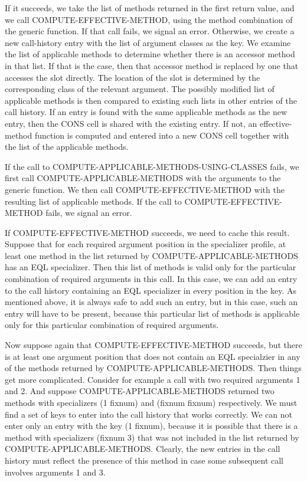 If it succeeds, we take the list of methods returned in the
first return value, and we call COMPUTE-EFFECTIVE-METHOD, using the
method combination of the generic function.  If that call fails, we
signal an error.  Otherwise, we create a new call-history entry with
the list of argument classes as the key.  We examine the list of
applicable methods to determine whether there is an accessor method in
that list.  If that is the case, then that accessor method is replaced
by one that accesses the slot directly.  The location of the slot is
determined by the corresponding class of the relevant argument.  The
possibly modified list of applicable methods is then compared to
existing such lists in other entries of the call history.  If an entry
is found with the same applicable methods as the new entry, then the
CONS cell is shared with the existing entry.  If not, an
effective-method function is computed and entered into a new CONS cell
together with the list of the applicable methods.

If the call to COMPUTE-APPLICABLE-METHODS-USING-CLASSES fails, we
first call COMPUTE-APPLICABLE-METHODS with the arguments to the
generic function.  We then call COMPUTE-EFFECTIVE-METHOD with the
resulting list of applicable methods.  If the call to
COMPUTE-EFFECTIVE-METHOD fails, we signal an error. 

If COMPUTE-EFFECTIVE-METHOD succeeds, we need to cache this result.
Suppose that for each required argument position in the specializer
profile, at least one method in the list returned by
COMPUTE-APPLICABLE-METHODS has an EQL specializer.  Then this list of
methods is valid only for the particular combination of required
arguments in this call.  In this case, we can add an entry to the call
history containing an EQL specializer in every position in the key.
As mentioned above, it is always safe to add such an entry, but in
this case, such an entry will have to be present, because this
particular list of methods is applicable only for this particular
combination of required arguments.

Now suppose again that COMPUTE-EFFECTIVE-METHOD succeeds, but there is
at least one argument position that does not contain an EQL
specialzier in any of the methods returned by
COMPUTE-APPLICABLE-METHODS. Then things get more complicated.
Consider for example a call with two required arguments 1 and 2.  And
suppose COMPUTE-APPLICABLE-METHODS returned two methods with
specializers (1 fixnum) and (fixnum fixnum) respectively.  We must
find a set of keys to enter into the call history that works
correctly.  We can not enter only an entry with the key (1 fixnum),
because it is possible that there is a method with specializers
(fixnum 3) that was not included in the list returned by 
COMPUTE-APPLICABLE-METHODS.  Clearly, the new entries in the call
history must reflect the presence of this method in case some
subsequent call involves arguments 1 and 3.

